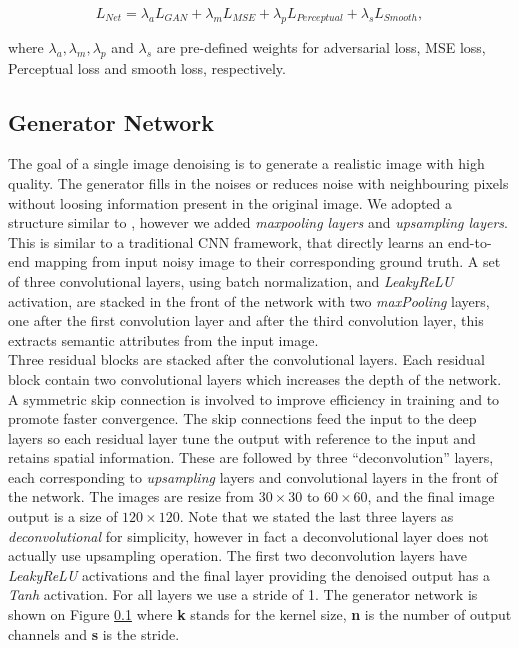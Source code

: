 \documentclass[journal]{IEEEtran}
\begin{document}
\begin{equation}
	L_{Net} = \lambda_a L_{GAN} + \lambda_m L_{MSE} + \lambda_p L_{Perceptual} + \lambda_s L_{Smooth},
\end{equation}

where $\lambda_a, \lambda_m, \lambda_p$ and $\lambda_s$ are pre-defined weights for adversarial loss, MSE loss, Perceptual loss and smooth loss, respectively.

\subsection{Generator Network}
\label{generator}
The goal of a single image denoising is to generate a realistic image with high quality.  The generator fills in the noises or reduces noise with neighbouring pixels without loosing information present in the original image.  We adopted a structure similar to \cite{alsaiari2019image}, however we added \emph{maxpooling layers} and \emph{upsampling layers}.  This is similar to a traditional CNN framework, that directly learns an end-to-end mapping from input noisy image to their corresponding ground truth.  A set of three convolutional layers, using batch normalization, and \emph{LeakyReLU} activation, are stacked in the front of the network with two \emph{maxPooling} layers, one after the first convolution layer and after the third convolution layer, this extracts semantic attributes from the input image.\\
	Three residual blocks are stacked after the convolutional layers.  Each residual block contain two convolutional layers which increases the depth of the network.  A symmetric skip connection is involved to improve efficiency in training and to promote faster convergence.  The skip connections feed the input to the deep layers so each residual layer tune the output with reference to the input and retains spatial information.  These are followed by three ``deconvolution'' layers, each corresponding to \emph{upsampling} layers and convolutional layers in the front of the network.   The images are resize from $30 \times 30$ to $60 \times 60$, and the final image output is a size of $120 \times 120$.  Note that we stated the last three layers as \emph{deconvolutional} for simplicity, however in fact a deconvolutional layer does not actually use upsampling operation.  The first two deconvolution layers have \emph{LeakyReLU} activations and the final layer providing the denoised output has a \emph{Tanh} activation.  For all layers we use a stride of 1.  The generator network is shown on Figure \ref{generator} where \textbf{k} stands for the kernel size, \textbf{n} is the number of output channels and \textbf{s} is the stride. 
\end{document}
